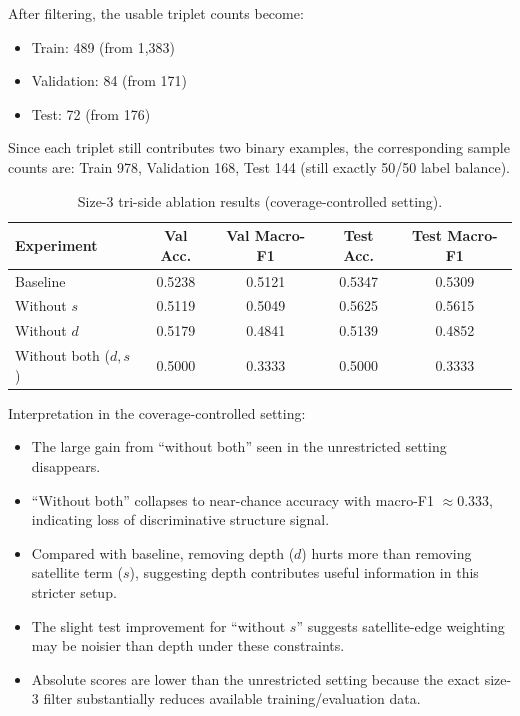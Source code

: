 \documentclass[12pt,a4paper]{article}
\begin{document}
After filtering, the usable triplet counts become:
\begin{itemize}
\item Train: 489 (from 1,383)
\item Validation: 84 (from 171)
\item Test: 72 (from 176)
\end{itemize}

Since each triplet still contributes two binary examples, the corresponding sample counts are:
Train 978, Validation 168, Test 144 (still exactly 50/50 label balance).

\begin{table}[h]
\centering
\begin{tabular}{lcccc}
\hline
\textbf{Experiment} & \textbf{Val Acc.} & \textbf{Val Macro-F1} & \textbf{Test Acc.} & \textbf{Test Macro-F1} \\
\hline
Baseline & 0.5238 & 0.5121 & 0.5347 & 0.5309 \\
Without $s$ & 0.5119 & 0.5049 & 0.5625 & 0.5615 \\
Without $d$ & 0.5179 & 0.4841 & 0.5139 & 0.4852 \\
Without both ($d,s$) & 0.5000 & 0.3333 & 0.5000 & 0.3333 \\
\hline
\end{tabular}
\caption{Size-3 tri-side ablation results (coverage-controlled setting).}
\label{tab:size3_structural_ablation_results}
\end{table}

Interpretation in the coverage-controlled setting:
\begin{itemize}
\item The large gain from ``without both'' seen in the unrestricted setting disappears.
\item ``Without both'' collapses to near-chance accuracy with macro-F1 $\approx 0.333$, indicating loss of discriminative structure signal.
\item Compared with baseline, removing depth ($d$) hurts more than removing satellite term ($s$), suggesting depth contributes useful information in this stricter setup.
\item The slight test improvement for ``without $s$'' suggests satellite-edge weighting may be noisier than depth under these constraints.
\item Absolute scores are lower than the unrestricted setting because the exact size-3 filter substantially reduces available training/evaluation data.
\end{itemize}
\end{document}
